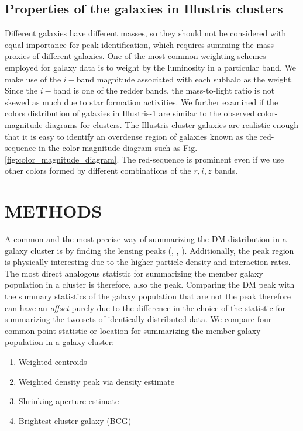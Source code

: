 \subsection{Properties of the galaxies in Illustris clusters}
\label{subsec:galaxy_properties}

Different galaxies have different masses, so they should not be considered with equal
importance for peak identification, which requires summing
the mass proxies of different galaxies. 
One of the most common weighting schemes employed for galaxy data is to weight
by the luminosity in a particular band. We make use of the $i-$band magnitude
associated with each subhalo as the weight. Since the $i-$band is
one of the redder bands, the mass-to-light ratio is not skewed as much due to star
formation activities. 
We further examined if the colors distribution of galaxies in Illustris-1 are
similar to the observed color-magnitude diagrams for clusters.
The Illustris cluster galaxies are realistic enough that it is easy to
identify an overdense region of galaxies known as the red-sequence in the 
color-magnitude diagram such as Fig.
\ref{fig:color_magnitude_diagram}. The red-sequence is prominent even if we
use other colors formed by different combinations of the $r, i, z$ bands.



\section{METHODS}\label{sec:methods}
A common and the most precise way of summarizing the DM distribution in a
galaxy cluster is by finding the lensing peaks 
(\citealt{Medezinski2013}, \citealt{Markevitch2004}, \citealt{Zitrin13}).
Additionally, the peak region is physically 
interesting due to the higher particle density and interaction rates. 
The most direct analogous statistic for summarizing the member galaxy
population in a cluster is therefore, also the peak. 
Comparing the DM peak with the summary statistics of the galaxy population that
are not the peak therefore can have an {\it offset} purely due to the difference in
the choice of the statistic for summarizing the two sets of identically
distributed data. 
We compare four common point statistic or location for summarizing 
the member galaxy population in a galaxy cluster:
\begin{enumerate}
\item Weighted centroids
\item Weighted density peak via density estimate  
\item Shrinking aperture estimate
\item Brightest cluster galaxy (BCG)
\end{enumerate}

